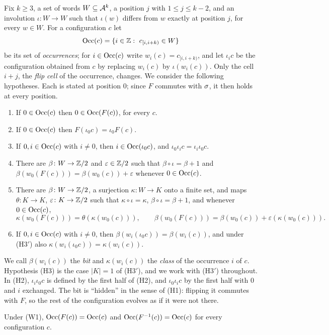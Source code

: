 Fix $k\ge3$, a set of words $W\subseteq\mathcal{A}^k$, a position $j$ with $1\le j\le k-2$, and an involution $\iota\colon W\to W$ such that $\iota(w)$ differs from $w$ exactly at position $j$, for every $w\in W$. For a configuration $c$ let
\[
\operatorname{Occ}(c)=\{i\in\mathbb{Z}:\ c_{[i,i+k)}\in W\}
\]
be its set of \emph{occurrences}; for $i\in\operatorname{Occ}(c)$ write $w_i(c)=c_{[i,i+k)}$, and let $\iota_ic$ be the configuration obtained from $c$ by replacing $w_i(c)$ by $\iota(w_i(c))$. Only the cell $i+j$, the \emph{flip cell} of the occurrence, changes. We consider the following hypotheses. Each is stated at position $0$; since $F$ commutes with $\sigma$, it then holds at every position.
\begin{enumerate}
\item[(W1)] If $0\in\operatorname{Occ}(c)$ then $0\in\operatorname{Occ}(F(c))$, for every $c$.
\item[(H1)] If $0\in\operatorname{Occ}(c)$ then $F(\iota_0c)=\iota_0F(c)$.
\item[(H2)] If $0,i\in\operatorname{Occ}(c)$ with $i\ne0$, then $i\in\operatorname{Occ}(\iota_0c)$, and $\iota_0\iota_ic=\iota_i\iota_0c$.
\item[(H3)] There are $\beta\colon W\to\mathbb{Z}/2$ and $\varepsilon\in\mathbb{Z}/2$ such that $\beta\circ\iota=\beta+1$ and $\beta(w_0(F(c)))=\beta(w_0(c))+\varepsilon$ whenever $0\in\operatorname{Occ}(c)$.
\item[(H3$'$)] There are $\beta\colon W\to\mathbb{Z}/2$, a surjection $\kappa\colon W\to K$ onto a finite set, and maps $\theta\colon K\to K$, $\varepsilon\colon K\to\mathbb{Z}/2$ such that $\kappa\circ\iota=\kappa$, $\beta\circ\iota=\beta+1$, and whenever $0\in\operatorname{Occ}(c)$,
\[
\kappa(w_0(F(c)))=\theta(\kappa(w_0(c))),\qquad \beta(w_0(F(c)))=\beta(w_0(c))+\varepsilon(\kappa(w_0(c))).
\]
\item[(H4)] If $0,i\in\operatorname{Occ}(c)$ with $i\ne0$, then $\beta(w_i(\iota_0c))=\beta(w_i(c))$, and under (H3$'$) also $\kappa(w_i(\iota_0c))=\kappa(w_i(c))$.
\end{enumerate}
We call $\beta(w_i(c))$ the \emph{bit} and $\kappa(w_i(c))$ the \emph{class} of the occurrence $i$ of $c$. Hypothesis (H3) is the case $|K|=1$ of (H3$'$), and we work with (H3$'$) throughout. In (H2), $\iota_i\iota_0c$ is defined by the first half of (H2), and $\iota_0\iota_ic$ by the first half with $0$ and $i$ exchanged. The bit is ``hidden'' in the sense of (H1): flipping it commutes with $F$, so the rest of the configuration evolves as if it were not there.

\begin{lemma}\label{hw:exact}
Under \textup{(W1)}, $\operatorname{Occ}(F(c))=\operatorname{Occ}(c)$ and $\operatorname{Occ}(F^{-1}(c))=\operatorname{Occ}(c)$ for every configuration $c$.
\end{lemma}

